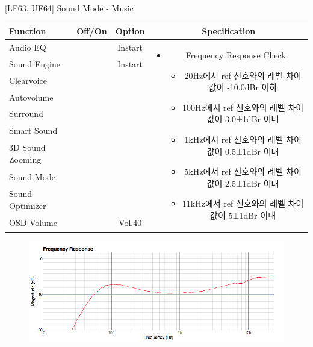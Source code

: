 \begin{frame}[t]{[LF63, UF64] Sound Mode - Music}
\begin{tiny}
\begin{tabular}{@{}lccc@{}}
\toprule
Function & Off/On & Option & Specification \\
\midrule
Audio EQ & \color{black}{Off} & Instart &
\multirow{10}{60mm}{
\begin{itemize}
\item Frequency Response Check
	\begin{itemize}
	\item 20Hz에서 ref 신호와의 레벨 차이값이 -10.0dBr 이하
	\item 100Hz에서 ref 신호와의 레벨 차이값이 3.0±1dBr 이내
	\item 1kHz에서 ref 신호와의 레벨 차이값이 0.5±1dBr 이내
	\item 5kHz에서 ref 신호와의 레벨 차이값이 2.5±1dBr 이내
	\item 11kHz에서 ref 신호와의 레벨 차이값이 5±1dBr 이내
	\end{itemize}
\end{itemize}
} \\
Sound Engine & \color{blue}{On} & Instart & \\
Clearvoice & \color{black}{Off} & & \\
Autovolume & \color{black}{Off} & & \\
Surround & \color{black}{Off} & & \\
Smart Sound & \color{black}{Off} & & \\
3D Sound Zooming & \color{black}{Off} & & \\
Sound Mode & \color{blue}{On} & \color{blue}{Music} & \\
Sound Optimizer & \color{black}{Off} & & \\
OSD Volume & \color{blue}{On} & Vol.40 & \\
\midrule
\end{tabular}
\end{tiny}

\begin{figure}[b]
\includegraphics[height=0.4\textwidth]{figures/music.png}
\end{figure}

\end{frame}
